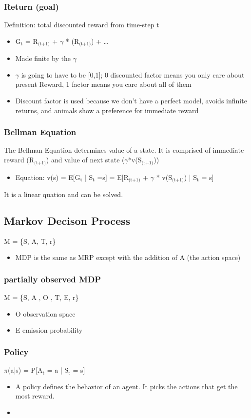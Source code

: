 \documentclass[11pt]{article}
\begin{document}
\subsubsection{Return (goal)}
\label{sec-1-2-1}
Definition: total discounted reward from time-step t
\begin{itemize}
\item G$_{\text{t}}$ = R$_{\text{(t+1)}}$ + $\gamma$ * (R$_{\text{(t+1)}}$) +  \ldots{}
\item Made finite by the $\gamma$
\item $\gamma$ is going to have to be [0,1]; 0 discounted factor means you only care about present Reward, 1 factor means you care about all of them
\item Discount factor is used because we don't have a perfect model, avoids infinite returns, and animals show a preference for immediate reward
\end{itemize}
\subsubsection{Bellman Equation}
\label{sec-1-2-2}
The Bellman Equation determines value of a state. It is comprised of immediate reward (R$_{\text{(t+1)}}$) and value of next state ($\gamma$*v(S$_{\text{(t+1)}}$))
\begin{itemize}
\item Equation: v(s) = E[G$_{\text{t}}$ | S$_{\text{t}}$ =s] = E[R$_{\text{(t+1)}}$ + $\gamma$ * v(S$_{\text{(t+1)}}$) | S$_{\text{t}}$ = s]
\end{itemize}
It is a linear quation and can be solved. 
\subsection{Markov Decison Process}
\label{sec-1-3}
M = \{S, A, T, r\}
\begin{itemize}
\item MDP is the same as MRP except with the addition of A (the action space)
\end{itemize}
\subsubsection{partially observed MDP}
\label{sec-1-3-1}
M = \{S, A , O , T, E, r\}
\begin{itemize}
\item O observation space
\item E emission probability
\end{itemize}
\subsubsection{Policy}
\label{sec-1-3-2}
$\pi$(a|s) = P[A$_{\text{t}}$ = a | S$_{\text{t}}$ = s]
\begin{itemize}
\item A policy defines the behavior of an agent. It picks the actions that get the most reward.
\item 
\end{itemize}
\end{document}
